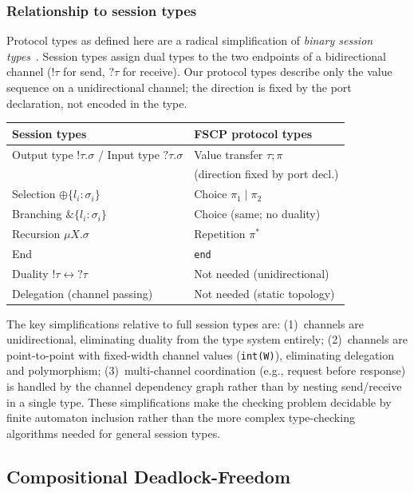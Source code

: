 \documentclass[11pt]{article}
\begin{document}
\subsubsection{Relationship to session types}

Protocol types as defined here are a radical simplification of
\emph{binary session types}~\cite{honda1998}.  Session types assign
dual types to the two endpoints of a bidirectional channel ($!\tau$
for send, $?\tau$ for receive).  Our protocol types describe only
the value sequence on a unidirectional channel; the direction is
fixed by the port declaration, not encoded in the type.

\begin{center}
\begin{tabular}{ll}
\toprule
\textbf{Session types} & \textbf{FSCP protocol types} \\
\midrule
Output type $!\tau.\sigma$ / Input type $?\tau.\sigma$
  & Value transfer $\tau \mathbin{;} \pi$ \\
  & (direction fixed by port decl.) \\
Selection $\oplus\{l_i: \sigma_i\}$ & Choice $\pi_1 \mid \pi_2$ \\
Branching $\&\{l_i: \sigma_i\}$ & Choice (same; no duality) \\
Recursion $\mu X.\sigma$ & Repetition $\pi^{*}$ \\
End & \texttt{end} \\
Duality $!\tau \leftrightarrow ?\tau$ & Not needed (unidirectional) \\
Delegation (channel passing) & Not needed (static topology) \\
\bottomrule
\end{tabular}
\end{center}

The key simplifications relative to full session types are:
(1)~channels are unidirectional, eliminating duality from the type
system entirely; (2)~channels are point-to-point with fixed-width
channel values (\texttt{int(W)}), eliminating delegation and
polymorphism; (3)~multi-channel
coordination (e.g., request before response) is handled by the
channel dependency graph rather than by nesting send/receive in a
single type.  These simplifications make the checking problem
decidable by finite automaton inclusion rather than the more complex
type-checking algorithms needed for general session types.

\subsection{Compositional Deadlock-Freedom}
\label{sec:deadlock-freedom}
\end{document}
